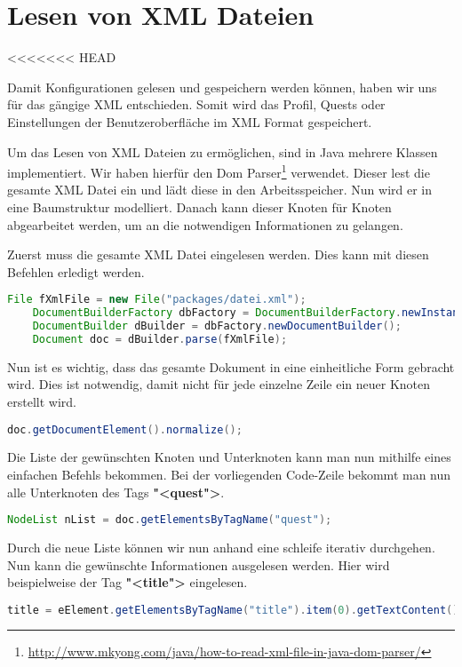 \section{Lesen von XML Dateien}
<<<<<<< HEAD
\label{sec:xml-read}

Damit Konfigurationen gelesen und gespeichern werden können, haben wir uns für das gängige XML entschieden. Somit wird das Profil, Quests oder Einstellungen der Benutzeroberfläche im XML Format gespeichert.

Um das Lesen von XML Dateien zu ermöglichen, sind in Java mehrere Klassen implementiert. Wir haben hierfür den Dom Parser\footnote{\url{http://www.mkyong.com/java/how-to-read-xml-file-in-java-dom-parser/}} verwendet. Dieser lest die gesamte XML Datei ein und lädt diese in den Arbeitsspeicher. Nun wird er in eine Baumstruktur modelliert. Danach kann dieser Knoten für Knoten abgearbeitet werden, um an die notwendigen Informationen zu gelangen.

Zuerst muss die gesamte XML Datei eingelesen werden. Dies kann mit diesen Befehlen erledigt werden.
\begin{lstlisting}[language=JAVA]
	File fXmlFile = new File("packages/datei.xml");
	DocumentBuilderFactory dbFactory = DocumentBuilderFactory.newInstance();
	DocumentBuilder dBuilder = dbFactory.newDocumentBuilder();
	Document doc = dBuilder.parse(fXmlFile);
\end{lstlisting}

Nun ist es wichtig, dass das gesamte Dokument in eine einheitliche Form gebracht wird. Dies ist notwendig, damit nicht für jede einzelne Zeile ein neuer Knoten erstellt wird.
\begin{lstlisting}[language=JAVA]
	doc.getDocumentElement().normalize();
\end{lstlisting}

Die Liste der gewünschten Knoten und Unterknoten kann man nun mithilfe eines einfachen Befehls bekommen. Bei der vorliegenden Code-Zeile bekommt man nun alle Unterknoten des Tags \textbf{"<quest">}.
\begin{lstlisting}[language=JAVA]
	NodeList nList = doc.getElementsByTagName("quest");
\end{lstlisting}
Durch die neue Liste können wir nun anhand eine schleife iterativ durchgehen. Nun kann die gewünschte Informationen ausgelesen werden. Hier wird beispielweise der Tag \textbf{"<title">} eingelesen.
\begin{lstlisting}[language=JAVA]
title = eElement.getElementsByTagName("title").item(0).getTextContent();
\end{lstlisting}

